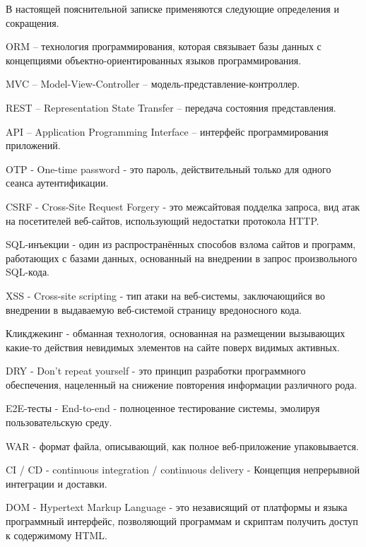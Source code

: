 
В настоящей пояснительной записке применяются следующие определения и сокращения.

ORM – технология программирования, которая связывает базы данных с концепциями объектно-ориентированных языков программирования.

MVC – Model-View-Controller – модель-представление-контроллер.

REST – Representation State Transfer – передача состояния представления.

API – Application Programming Interface – интерфейс программирования приложений.

OTP - One-time password - это пароль, действительный только для одного сеанса аутентификации.

CSRF - Cross-Site Request Forgery - это межсайтовая подделка запроса, вид атак на посетителей веб-сайтов, использующий недостатки протокола HTTP.

SQL-инъекции - один из распространённых способов взлома сайтов и программ, работающих с базами данных, основанный на внедрении в запрос произвольного SQL-кода.

XSS - Cross-site scripting - тип атаки на веб-системы, заключающийся во внедрении в выдаваемую веб-системой страницу вредоносного кода.

Кликджекинг - обманная технология, основанная на размещении вызывающих какие-то действия невидимых элементов на сайте поверх видимых активных.

DRY - Don't repeat yourself - это принцип разработки программного обеспечения, нацеленный на снижение повторения информации различного рода.

E2E-тесты - End-to-end - полноценное тестирование системы, эмолируя пользовательскую среду.

WAR - формат файла, описывающий, как полное веб-приложение упаковывается.

CI / CD - continuous integration / continuous delivery - Концепция непрерывной интеграции и доставки.

DOM - Hypertext Markup Language - это независящий от платформы и языка программный интерфейс, позволяющий программам и скриптам получить доступ к содержимому HTML.
